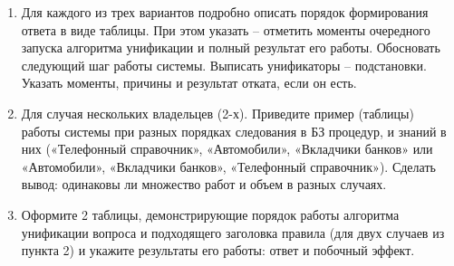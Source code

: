 \documentclass[12pt]{report}
\begin{document}
\begin{enumerate}
	\item Для каждого из трех вариантов подробно описать порядок формирования ответа в виде таблицы. При этом указать – отметить моменты очередного запуска алгоритма унификации и полный результат его работы. Обосновать следующий шаг работы системы. Выписать унификаторы – подстановки. Указать моменты, причины и результат
	отката, если он есть.
	\item Для случая нескольких владельцев (2-х). Приведите пример (таблицы) работы системы при разных порядках следования в БЗ процедур,
	и знаний в них («Телефонный справочник», «Автомобили», «Вкладчики банков» или «Автомобили», «Вкладчики банков», «Телефонный
	справочник»). Сделать вывод: одинаковы ли множество работ и объем в разных случаях.
	\item Оформите 2 таблицы, демонстрирующие порядок работы алгоритма
	унификации вопроса и подходящего заголовка правила (для двух случаев из пункта 2) и укажите результаты его работы: ответ и побочный эффект.
\end{enumerate}
\end{document}
